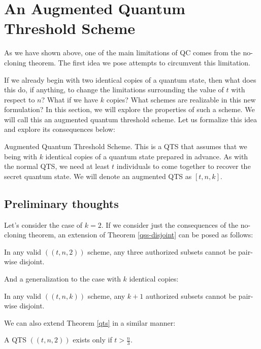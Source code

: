 \chapter{An Augmented Quantum Threshold Scheme}
\label{ch3}

As we have shown above, one of the main limitations of QC comes from the no-cloning theorem. The first idea we pose attempts to circumvent this limitation. 

If we already begin with two identical copies of a quantum state, then what does this do, if anything, to change the limitations surrounding the value of $t$ with respect to $n$? What if we have $k$ copies? What schemes are realizable in this new formulation? In this section, we will explore the properties of such a scheme. We will call this an augmented quantum threshold scheme. Let us formalize this idea and explore its consequences below:

\theoremstyle{definition}
\begin{definition}{Augmented Quantum Threshold Scheme.}
     This is a QTS that assumes that we being with $k$ identical copies of a quantum state prepared in advance. As with the normal QTS, we need at least $t$ individuals to come together to recover the secret quantum state. We will denote an augmented QTS as $[t,n,k]$.
\end{definition}

\section{Preliminary thoughts}

Let's consider the case of $k=2$. If we consider just the consequences of the no-cloning theorem, an extension of Theorem \ref{qss-disjoint} can be posed as follows:

\begin{theorem}
    In any valid $((t,n,2))$ scheme, any three authorized subsets cannot be pair-wise disjoint.
\end{theorem}

And a generalization to the case with $k$ identical copies:

\begin{theorem}
    In any valid $((t,n,k))$ scheme, any $k+1$ authorized subsets cannot be pair-wise disjoint.
\end{theorem}

We can also extend Theorem \ref{qts} in a similar manner:

\begin{theorem}
	\label{qts2}
	A QTS $((t,n, 2))$ exists only if $t > \frac{n}{3}$.
\end{theorem}

